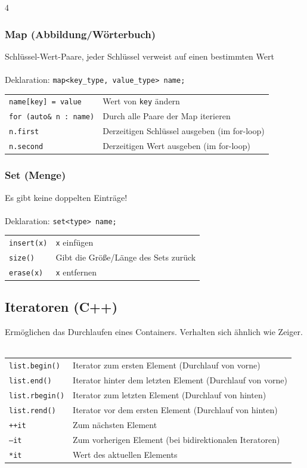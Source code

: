 \documentclass[fs, footer]{latex4ei}
\begin{document}
\begin{multicols*}{4}
{{\subsubsection{Map (Abbildung/Wörterbuch)}
Schlüssel-Wert-Paare, jeder Schlüssel verweist auf einen bestimmten Wert\\ \\
Deklaration: \texttt{map<key\_type, value\_type> name;}\\
\begin{tabular}{ll}
\texttt{name[key] = value}& Wert von \texttt{key} ändern\\
\texttt{for (auto\& n : name)}& Durch alle Paare der Map iterieren\\
\texttt{n.first}& Derzeitigen Schlüssel ausgeben (im for-loop)\\
\texttt{n.second}& Derzeitigen Wert ausgeben (im for-loop)\\
\end{tabular}

\subsubsection{Set (Menge)}
Es gibt keine doppelten Einträge!\\ \\
Deklaration: \texttt{set<type> name;}\\
\begin{tabular}{ll}
\texttt{insert(x)}& \texttt{x} einfügen\\
\texttt{size()}& Gibt die Größe/Länge des Sets zurück\\
\texttt{erase(x)}& \texttt{x} entfernen\\
\end{tabular}


\subsection{Iteratoren (C++)}
Ermöglichen das Durchlaufen eines Containers.
Verhalten sich ähnlich wie Zeiger.\\ \\
\begin{tabular}{ll}
\texttt{list.begin()}& Iterator zum ersten Element (Durchlauf von vorne)\\
\texttt{list.end()}& Iterator hinter dem letzten Element (Durchlauf von vorne)\\
\texttt{list.rbegin()}& Iterator zum letzten Element (Durchlauf von hinten)\\
\texttt{list.rend()}& Iterator vor dem ersten Element (Durchlauf von hinten)\\
\texttt{++it}& Zum nächsten Element\\
\texttt{--it}& Zum vorherigen Element (bei bidirektionalen Iteratoren)\\
\texttt{*it}& Wert des aktuellen Elements\\
\end{tabular}


}}
\end{multicols*}
\end{document}
